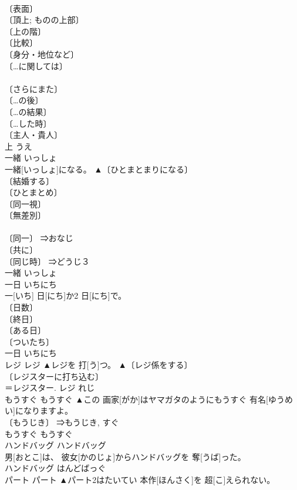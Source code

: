\documentclass[8pt]{extreport}
\begin{document}
\begin{CJK}{UTF8}{min}
\\	〔表面〕 
\\	〔頂上; ものの上部〕 
\\	〔上の階〕 
\\	〔比較〕 
\\	〔身分・地位など〕 
\\	〔…に関しては〕 
\\	[＝-じょう１] 
\\	〔さらにまた〕 
\\	〔…の後〕 
\\	〔…の結果〕 
\\	〔…した時〕 
\\	〔主人・貴人〕 
\\	上	うえ	
\\	一緒	いっしょ	
\\	一緒[いっしょ]になる。	▲〔ひとまとまりになる〕 
\\	〔結婚する〕 
\\	〔ひとまとめ〕 
\\	〔同一視〕 
\\	〔無差別〕 
\\	[⇒いっしょくた] 
\\	〔同一〕 ⇒おなじ 
\\	〔共に〕 
\\	〔同じ時〕 ⇒どうじ３ 
\\	一緒	いっしょ	
\\	一日	いちにち	
\\	一[いち] 日[にち]か2 日[にち]で。	
\\	〔日数〕 
\\	〔終日〕 
\\	〔ある日〕 
\\	〔ついたち〕 
\\	一日	いちにち	
\\	レジ	レジ	▲レジを 打[う]つ。	▲〔レジ係をする〕 
\\	〔レジスターに打ち込む〕 
\\	＝レジスター.	レジ	れじ	
\\	もうすぐ	もうすぐ	▲この 画家[がか]はヤマガタのようにもうすぐ 有名[ゆうめい]になりますよ。	
\\	〔もうじき〕 ⇒もうじき, すぐ 
\\	もうすぐ	もうすぐ	
\\	ハンドバッグ	ハンドバッグ	
\\	男[おとこ]は、 彼女[かのじょ]からハンドバッグを 奪[うば]った。	
\\	ハンドバッグ	はんどばっぐ	
\\	パート	パート	▲パート2はたいてい 本作[ほんさく]を 超[こ]えられない。	

\end{CJK}
\end{document}
